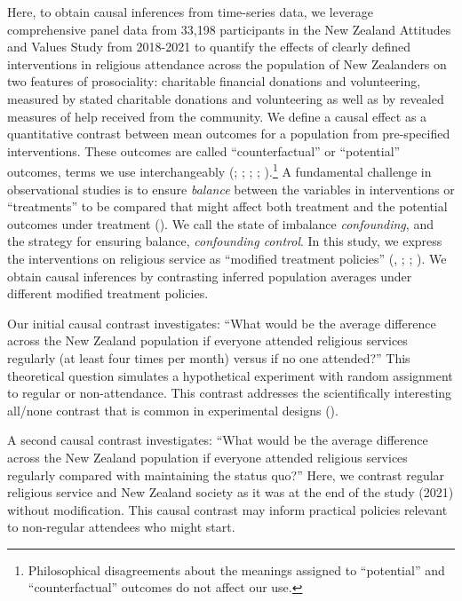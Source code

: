 \documentclass[
  single column]{article}
\begin{document}
Here, to obtain causal inferences from time-series data, we leverage
comprehensive panel data from 33,198 participants in the New Zealand
Attitudes and Values Study from 2018-2021 to quantify the effects of
clearly defined interventions in religious attendance across the
population of New Zealanders on two features of prosociality: charitable
financial donations and volunteering, measured by stated charitable
donations and volunteering as well as by revealed measures of help
received from the community. We define a causal effect as a quantitative
contrast between mean outcomes for a population from pre-specified
interventions. These outcomes are called ``counterfactual'' or
``potential'' outcomes, terms we use interchangeably
(; ; ;
;
).\footnote{Philosophical
  disagreements about the meanings assigned to ``potential'' and
  ``counterfactual'' outcomes do not affect our use.} A fundamental
challenge in observational studies is to ensure \emph{balance} between
the variables in interventions or ``treatments'' to be compared that
might affect both treatment and the potential outcomes under treatment
(). We call the
state of imbalance \emph{confounding}, and the strategy for ensuring
balance, \emph{confounding control}. In this study, we express the
interventions on religious service as ``modified treatment policies''
(,
;
;
). We obtain
causal inferences by contrasting inferred population averages under
different modified treatment policies.

Our initial causal contrast investigates: ``What would be the average
difference across the New Zealand population if everyone attended
religious services regularly (at least four times per month) versus if
no one attended?'' This theoretical question simulates a hypothetical
experiment with random assignment to regular or non-attendance. This
contrast addresses the scientifically interesting all/none contrast that
is common in experimental designs ().

A second causal contrast investigates: ``What would be the average
difference across the New Zealand population if everyone attended
religious services regularly compared with maintaining the status quo?''
Here, we contrast regular religious service and New Zealand society as
it was at the end of the study (2021) without modification. This causal
contrast may inform practical policies relevant to non-regular attendees
who might start.
\end{document}
